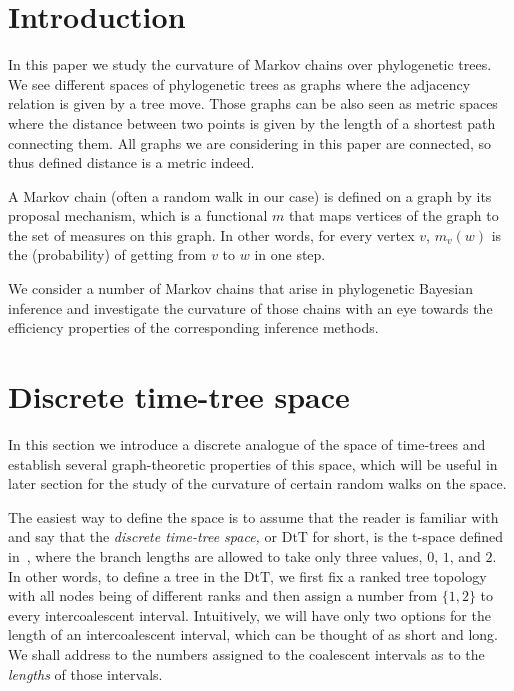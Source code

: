 \documentclass{amsart}
\newcommand{\dts}{\mathrm{DtT}}
\begin{document}
\section{Introduction}

In this paper we study the curvature of Markov chains over phylogenetic trees. 
We see different spaces of phylogenetic trees as graphs where the adjacency 
relation is given by a tree move. Those graphs can be also seen as metric 
spaces where the distance between two points is given by the length of a
shortest path connecting them. All graphs we are considering in this paper are
connected, so thus defined distance is a metric indeed. 

A Markov chain (often a random walk in our case) is defined on a graph by its
proposal mechanism, which is a functional $m$ that maps vertices of the graph to
the set of measures on this graph. In other words, for every vertex $v$, 
$m_v(w)$ is the (probability) of getting from $v$ to $w$ in one step. 

We consider a number of Markov chains that arise 
in phylogenetic Bayesian 
inference and investigate the curvature of those chains with an eye towards 
the efficiency properties of the corresponding inference methods. 

\section{Discrete time-tree space}

In this section we introduce a discrete analogue of the space of time-trees
and establish several graph-theoretic properties of this space, which will
be useful in later section for the study of the curvature of certain random
walks on the space. 

The easiest way to define the space is to assume that the reader is familiar 
with~\cite{Gavryushkin2014-bw} and say that the 
{\em discrete time-tree space,}
or $\dts$ for short, is the $\mathrm t$-space defined 
in~\cite{Gavryushkin2014-bw}, where the
branch lengths are allowed to take only three values, $0$, $1$, and $2$. 
In other words, to define a tree in the $\dts$, we first fix a ranked tree 
topology with all nodes being of different ranks and then assign a number
from $\{1,2\}$ to every intercoalescent interval. Intuitively, we will have
only two options for the length of an intercoalescent interval, which can
be thought of as short 
and long. 
We shall address to the numbers assigned to the coalescent intervals as to
the {\em lengths} of those intervals. 
\end{document}

